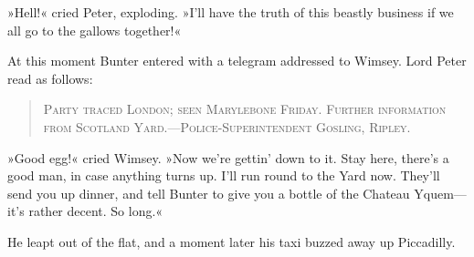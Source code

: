 »Hell!« cried Peter, exploding. »I'll have the truth of this beastly business if we all go to the gallows together!«

At this moment Bunter entered with a telegram addressed to Wimsey. Lord Peter read as follows:

\begin{quote}

\textsc{Party traced London; seen Marylebone Friday. Further information from Scotland Yard.---Police-Superintendent Gosling, Ripley.}

\end{quote}

»Good egg!« cried Wimsey. »Now we're gettin' down to it. Stay here, there's a good man, in case anything turns up. I'll run round to the Yard now. They'll send you up dinner, and tell Bunter to give you a bottle of the Chateau Yquem\allowbreak---\allowbreak it's rather decent. So long.«

He leapt out of the flat, and a moment later his taxi buzzed away up Piccadilly.
